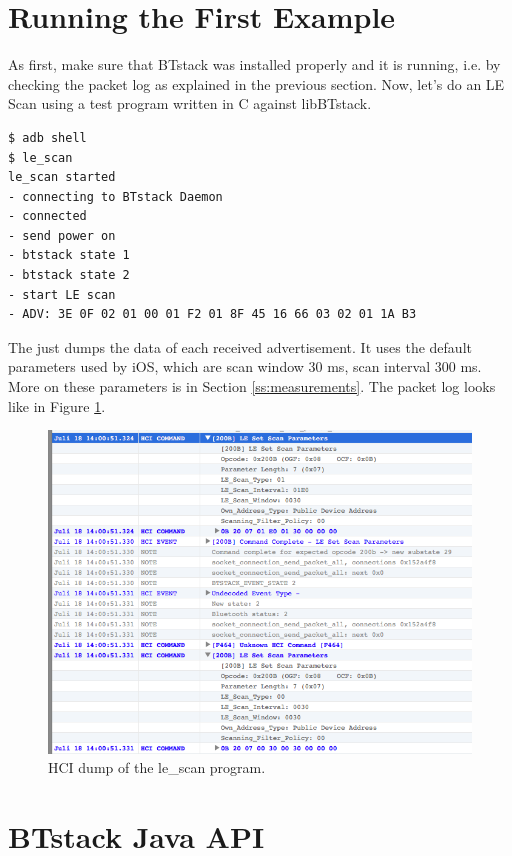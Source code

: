 \documentclass[a4paper,titlepage,oneside,12pt]{amsart} %
\begin{document}
\section{Running the First Example}

As first, make sure that BTstack was installed properly and it is running, i.e. by checking the packet log as explained in the previous section. Now, let's do an LE Scan using a test program written in C against libBTstack.

\begin{lstlisting}
$ adb shell
$ le_scan
le_scan started
- connecting to BTstack Daemon
- connected
- send power on
- btstack state 1
- btstack state 2
- start LE scan
- ADV: 3E 0F 02 01 00 01 F2 01 8F 45 16 66 03 02 01 1A B3
\end{lstlisting}

The  just dumps the data of each received advertisement. It uses the default parameters used by iOS, which are scan window 30 ms, scan interval 300 ms. More on these parameters is in Section \ref{ss:measurements}. The packet log looks like in Figure \ref{fig:leScan}.

\begin{figure}[htbp]
\begin{center}
 \includegraphics[width=\textwidth]{picts/scan_parameters_hci_dump.png} 
\caption{HCI dump of the le\_scan program.}
\label{fig:leScan}
\end{center}
\end{figure}

\section{BTstack Java API}
\end{document}
